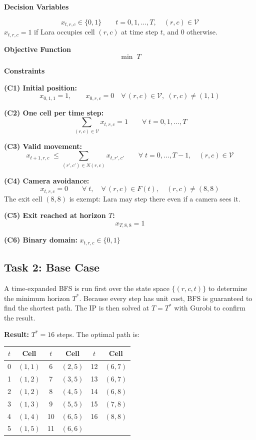 \documentclass[12pt,a4paper]{article}
\begin{document}
\textbf{Decision Variables}

\[
  x_{t,r,c} \in \{0,1\} \qquad t=0,1,\ldots,T,\quad (r,c)\in\mathcal{V}
\]
$x_{t,r,c}=1$ if Lara occupies cell $(r,c)$ at time step $t$, and $0$ otherwise.

\textbf{Objective Function}
\[
  \min\; T
\]

\textbf{Constraints}

\textbf{(C1) Initial position:}
\[
  x_{0,1,1}=1, \qquad x_{0,r,c}=0 \quad \forall\,(r,c)\in\mathcal{V},\;(r,c)\neq(1,1)
\]

\textbf{(C2) One cell per time step:}
\[
  \sum_{(r,c)\in\mathcal{V}} x_{t,r,c}=1 \qquad \forall\;t=0,1,\ldots,T
\]

\textbf{(C3) Valid movement:}
\[
  x_{t+1,r,c}\;\leq\!\!\sum_{(r',c')\in N(r,c)}\!\! x_{t,r',c'}
  \qquad \forall\;t=0,\ldots,T-1,\quad(r,c)\in\mathcal{V}
\]

\textbf{(C4) Camera avoidance:}
\[
  x_{t,r,c}=0 \qquad \forall\;t,\quad\forall\,(r,c)\in F(t),\quad(r,c)\neq(8,8)
\]
The exit cell $(8,8)$ is exempt: Lara may step there even if a camera sees it.

\textbf{(C5) Exit reached at horizon $T$:}
\[
  x_{T,8,8}=1
\]

\textbf{(C6) Binary domain:} $x_{t,r,c}\in\{0,1\}$

\subsection*{Task 2: Base Case}

A time-expanded BFS is run first over the state space $\{(r,c,t)\}$ to determine the minimum
horizon $T^*$. Because every step has unit cost, BFS is guaranteed to find the shortest path.
The IP is then solved at $T=T^*$ with Gurobi to confirm the result.

\medskip
\textbf{Result:} $T^*=16$ steps. The optimal path is:

\begin{center}
\begin{tabular}{cc|cc|cc}
\toprule
$t$ & Cell & $t$ & Cell & $t$ & Cell \\
\midrule
 0 & $(1,1)$ &  6 & $(2,5)$ & 12 & $(6,7)$ \\
 1 & $(1,2)$ &  7 & $(3,5)$ & 13 & $(6,7)$ \\
 2 & $(1,2)$ &  8 & $(4,5)$ & 14 & $(6,8)$ \\
 3 & $(1,3)$ &  9 & $(5,5)$ & 15 & $(7,8)$ \\
 4 & $(1,4)$ & 10 & $(6,5)$ & 16 & $(8,8)$ \\
 5 & $(1,5)$ & 11 & $(6,6)$ & & \\
\bottomrule
\end{tabular}
\end{center}
\end{document}
